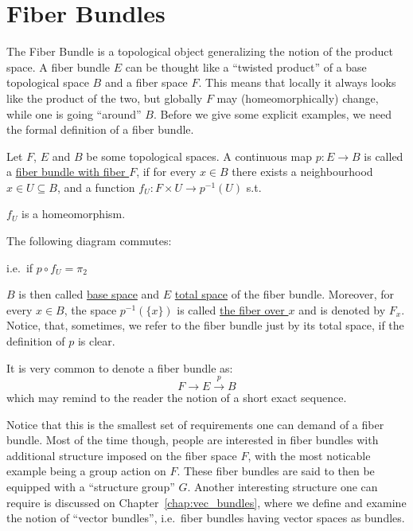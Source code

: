 \chapter{Fiber Bundles}
The Fiber Bundle is a topological object generalizing the notion of the product space. A fiber bundle $E$ can be thought like a ``twisted product'' of a base topological space $B$ and a fiber space $F$. This means that locally it always looks like the product of the two, but globally $F$ may (homeomorphically) change, while one is going ``around'' $B$. Before we give some explicit examples, we need the formal definition of a fiber bundle.

\begin{definition} Let $F$, $E$ and $B$ be some topological spaces. A continuous map $p:E\to B$ is called a \ul{fiber bundle with fiber $F$}, if for every $x\in B$ there exists a neighbourhood $x\in U\subseteq B$, and a function $f_U:F\times U\to p^{-1}(U)$ s.t.
\begin{i_enum}
\item $f_U$ is a homeomorphism.
\item The following diagram commutes:
\begin{center}
\end{center}
i.e.\ if $p\circ f_U=\pi_2$
\end{i_enum}
$B$ is then called \ul{base space} and $E$ \ul{total space} of the fiber bundle. Moreover, for every $x\in B$, the space $p^{-1}(\{x\})$ is called \ul{the fiber over $x$} and is denoted by $F_x$. Notice, that, sometimes, we refer to the fiber bundle just by its total space, if the definition of $p$ is clear.
\end{definition}

\begin{notation}
It is very common to denote a fiber bundle as:
\[F\to E\overset{p}{\to}B\]
which may remind to the reader the notion of a short exact sequence.
\end{notation}

Notice that this is the smallest set of requirements one can demand of a fiber bundle. Most of the time though, people are interested in fiber bundles with additional structure imposed on the fiber space $F$, with the most noticable example being a group action on $F$. These fiber bundles are said to then be equipped with a ``structure group'' $G$. Another interesting structure one can require is discussed on Chapter~\ref{chap:vec_bundles}, where we define and examine the notion of ``vector bundles'', i.e.\ fiber bundles having vector spaces as bundles.

